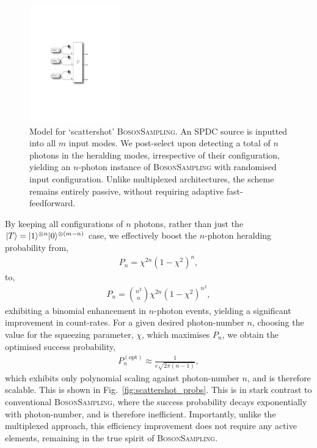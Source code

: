 \begin{figure}[htpb]
\includegraphics[width=0.35\textwidth]{scattershot_model}
\caption{Model for `scattershot' \textsc{BosonSampling}. An SPDC source is inputted into all $m$ input modes. We post-select upon detecting a total of $n$ photons in the heralding modes, irrespective of their configuration, yielding an $n$-photon instance of \textsc{BosonSampling} with randomised input configuration. Unlike multiplexed architectures, the scheme remains entirely passive, without requiring adaptive fast-feedforward.} \label{fig:scattershot_model}
\end{figure}

By keeping all configurations of $n$ photons, rather than just the \mbox{$|T\rangle=|1\rangle^{\otimes n} |0\rangle^{\otimes (m-n)}$} case, we effectively boost the $n$-photon heralding probability from,
\begin{align}
	P_n = \chi^{2n}(1-\chi^2)^n,	
\end{align}
to,
\begin{align}
	P_n = \binom{n^2}{n}\chi^{2n}(1-\chi^2)^{n^2},	
\end{align}
exhibiting a binomial enhancement in $n$-photon events, yielding a significant improvement in count-rates. For a given desired photon-number $n$, choosing the value for the squeezing parameter, $\chi$, which maximises $P_n$, we obtain the optimised success probability,
\begin{align}
	P_n^{(\mathrm{opt})} \approx \frac{1}{e\sqrt{2\pi(n-1)}},
\end{align}
which exhibits only polynomial scaling against photon-number $n$, and is therefore scalable. This is shown in Fig.~\ref{fig:scattershot_probs}. This is in stark contrast to conventional \textsc{BosonSampling}, where the success probability decays exponentially with photon-number, and is therefore inefficient. Importantly, unlike the multiplexed approach, this efficiency improvement does not require any active elements, remaining in the true spirit of \textsc{BosonSampling}.

